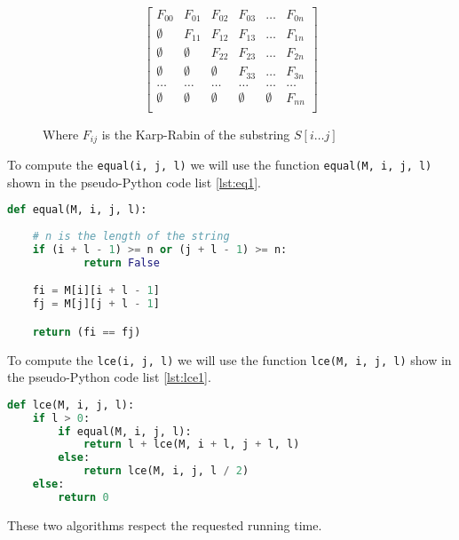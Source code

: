 \documentclass{article}
\begin{document}
\begin{figure}[htp]
\begin{equation}
    \begin{bmatrix}
        F_{00}      & F_{01}    & F_{02} & F_{03} & \dots & F_{0n} \\
        \emptyset   & F_{11}    & F_{12} & F_{13} & \dots & F_{1n} \\
        \emptyset   & \emptyset & F_{22} & F_{23} & \dots & F_{2n} \\
        \emptyset   & \emptyset & \emptyset & F_{33} & \dots & F_{3n} \\
        \dots & \dots & \dots & \dots & \dots & \dots \\
        \emptyset   & \emptyset & \emptyset & \emptyset & \emptyset & F_{nn} \\
    \end{bmatrix}
\end{equation}
\caption{Where $F_{ij}$ is the Karp-Rabin of the substring $S[i \dots j]$}
\end{figure}

\noindent To compute the \verb+equal(i, j, l)+ we will use the function \verb+equal(M, i, j, l)+ shown in the pseudo-Python code list \ref{lst:eq1}.

\begin{lstlisting}[label={lst:eq1},caption=``Function to compute the equality.'',language=Python]
def equal(M, i, j, l):
    
    # n is the length of the string
    if (i + l - 1) >= n or (j + l - 1) >= n:
            return False

    fi = M[i][i + l - 1]
    fj = M[j][j + l - 1]

    return (fi == fj)
\end{lstlisting}

\noindent To compute the \verb+lce(i, j, l)+ we will use the function \verb+lce(M, i, j, l)+ show in the pseudo-Python code list \ref{lst:lce1}.

\begin{lstlisting}[label={lst:lce1},caption=``Function to compute the longest common extension.'',language=Python]
def lce(M, i, j, l):
    if l > 0:
        if equal(M, i, j, l):
            return l + lce(M, i + l, j + l, l)
        else:
            return lce(M, i, j, l / 2)
    else:
        return 0
\end{lstlisting}

\noindent These two algorithms respect the requested running time.
\end{document}
